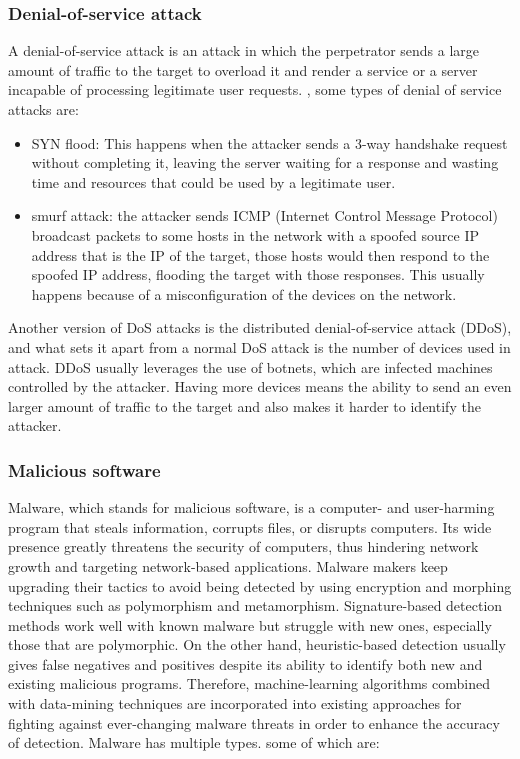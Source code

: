 \subsubsection{Denial-of-service attack}
A denial-of-service attack is an attack in which the perpetrator sends a large amount of traffic to the target to overload it and render a service or a server incapable of processing legitimate user requests. \cite{dos}, some types of denial of service attacks are:

	
\begin{itemize}
	\item SYN flood: This happens when the attacker sends a 3-way handshake request without completing it, leaving the server waiting for a response and wasting time and resources that could be used by a legitimate user. \cite{dos}
	\item smurf attack: the attacker sends ICMP (Internet Control Message Protocol) broadcast packets to some hosts in the network with a spoofed source IP address that is the IP of the target, those hosts would then respond to the spoofed IP address, flooding the target with those responses. This usually happens because of a misconfiguration of the devices on the network. \cite{dos}
\end{itemize}

Another version of DoS attacks is the distributed denial-of-service attack (DDoS), and what sets it apart from a normal DoS attack is the number of devices used in attack. DDoS usually leverages the use of botnets, which are infected machines controlled by the attacker. Having more devices means the ability to send an even larger amount of traffic to the target and also makes it harder to identify the attacker. \cite{dos}
	

\subsubsection{Malicious software}
Malware, which stands for malicious software, is a computer- and user-harming program that steals information, corrupts files, or disrupts computers. Its wide presence greatly threatens the security of computers, thus hindering network growth and targeting network-based applications. Malware makers keep upgrading their tactics to avoid being detected by using encryption and morphing techniques such as polymorphism and metamorphism. Signature-based detection methods work well with known malware but struggle with new ones, especially those that are polymorphic. On the other hand, heuristic-based detection usually gives false negatives and positives despite its ability to identify both new and existing malicious programs. Therefore, machine-learning algorithms combined with data-mining techniques are incorporated into existing approaches for fighting against ever-changing malware threats in order to enhance the accuracy of detection. \cite{malware} Malware has multiple types. some of which are:

